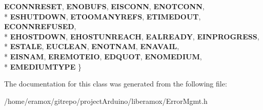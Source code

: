 \begin{DoxyCompactItemize}
{\bfseries E\+C\+O\+N\+N\+R\+E\+S\+ET}, 
{\bfseries E\+N\+O\+B\+U\+FS}, 
{\bfseries E\+I\+S\+C\+O\+NN}, 
{\bfseries E\+N\+O\+T\+C\+O\+NN}, 
\\*
{\bfseries E\+S\+H\+U\+T\+D\+O\+WN}, 
{\bfseries E\+T\+O\+O\+M\+A\+N\+Y\+R\+E\+FS}, 
{\bfseries E\+T\+I\+M\+E\+D\+O\+UT}, 
{\bfseries E\+C\+O\+N\+N\+R\+E\+F\+U\+S\+ED}, 
\\*
{\bfseries E\+H\+O\+S\+T\+D\+O\+WN}, 
{\bfseries E\+H\+O\+S\+T\+U\+N\+R\+E\+A\+CH}, 
{\bfseries E\+A\+L\+R\+E\+A\+DY}, 
{\bfseries E\+I\+N\+P\+R\+O\+G\+R\+E\+SS}, 
\\*
{\bfseries E\+S\+T\+A\+LE}, 
{\bfseries E\+U\+C\+L\+E\+AN}, 
{\bfseries E\+N\+O\+T\+N\+AM}, 
{\bfseries E\+N\+A\+V\+A\+IL}, 
\\*
{\bfseries E\+I\+S\+N\+AM}, 
{\bfseries E\+R\+E\+M\+O\+T\+E\+IO}, 
{\bfseries E\+D\+Q\+U\+OT}, 
{\bfseries E\+N\+O\+M\+E\+D\+I\+UM}, 
\\*
{\bfseries E\+M\+E\+D\+I\+U\+M\+T\+Y\+PE}
 \}\hypertarget{classliberamox_1_1ErrorMgmt_a5e39af0b825ab9130a1734e79200e2b6}{}\label{classliberamox_1_1ErrorMgmt_a5e39af0b825ab9130a1734e79200e2b6}

\end{DoxyCompactItemize}


The documentation for this class was generated from the following file\+:\begin{DoxyCompactItemize}
\item 
/home/eramox/gitrepo/project\+Arduino/liberamox/Error\+Mgmt.\+h\end{DoxyCompactItemize}
